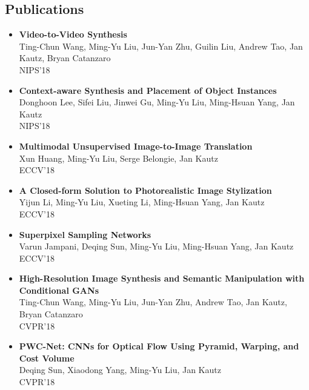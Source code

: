 \subsection*{Publications}
\begin{itemize}

\item {\bf Video-to-Video Synthesis}\\
       Ting-Chun Wang, Ming-Yu Liu, Jun-Yan Zhu, Guilin Liu, Andrew Tao, Jan Kautz, Bryan Catanzaro\\
       NIPS'18 \vspace{-2mm}
\item {\bf Context-aware Synthesis and Placement of Object Instances}\\
       Donghoon Lee, Sifei Liu, Jinwei Gu, Ming-Yu Liu, Ming-Hsuan Yang, Jan Kautz\\
       NIPS'18 \vspace{-2mm}       
\item {\bf Multimodal Unsupervised Image-to-Image Translation}\\
       Xun Huang, Ming-Yu Liu, Serge Belongie, Jan Kautz\\
       ECCV'18 \vspace{-2mm}
\item {\bf A Closed-form Solution to Photorealistic Image Stylization}\\
       Yijun Li, Ming-Yu Liu, Xueting Li, Ming-Hsuan Yang, Jan Kautz\\
       ECCV'18 \vspace{-2mm}
\item {\bf Superpixel Sampling Networks}\\
       Varun Jampani, Deqing Sun, Ming-Yu Liu, Ming-Hsuan Yang, Jan Kautz\\
       ECCV'18 \vspace{-2mm}
\item {\bf High-Resolution Image Synthesis and Semantic Manipulation with Conditional GANs}\\
       Ting-Chun Wang, Ming-Yu Liu, Jun-Yan Zhu, Andrew Tao, Jan Kautz, Bryan Catanzaro\\
       CVPR'18 \vspace{-2mm}
\item {\bf PWC-Net: CNNs for Optical Flow Using Pyramid, Warping, and Cost Volume}\\
       Deqing Sun, Xiaodong Yang, Ming-Yu Liu, Jan Kautz\\
       CVPR'18 \vspace{-2mm}

\end{itemize}

